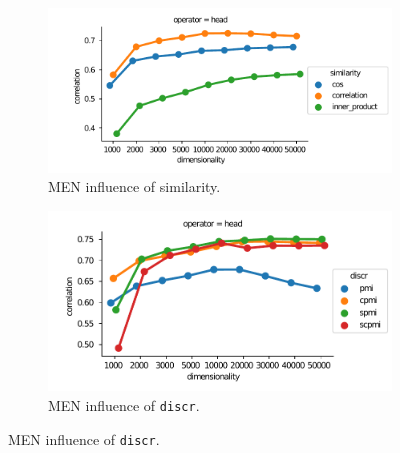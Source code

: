 \begin{figure}[bh]
  \centering
  \begin{subfigure}[t]{0.49\textwidth}
    \hspace{-20pt}
    \includegraphics[width=1.1\textwidth]{supplement/figures/men-interaction-similarity}

  \caption{MEN influence of similarity.}
  \label{fig:men-similarity}
  \end{subfigure}
  \begin{subfigure}[t]{0.49\textwidth}
    \includegraphics[width=\textwidth]{supplement/figures/men-interaction-discr}

  \caption{MEN influence of \texttt{discr}.}
  \label{fig:men-discr}
  \end{subfigure}
\end{figure}
